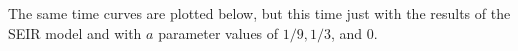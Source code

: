 \documentclass{article}
\begin{document}
The same time curves are plotted below, but this time just with the results of the SEIR model and with $a$ parameter values of $1/9, 1/3$, and $0$.
\begin{figure}[H]
        \centering
\end{figure}
\end{document}
